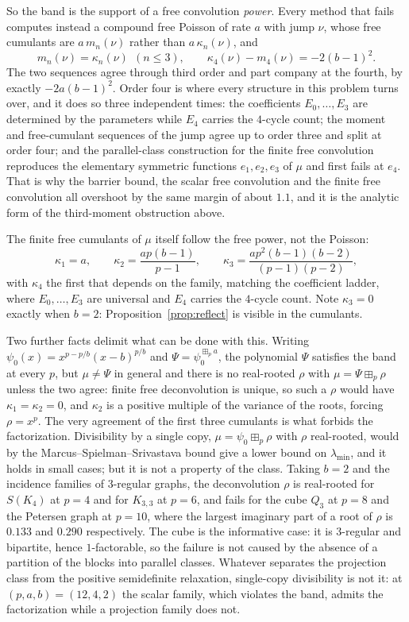 \documentclass[11pt]{article}
\theoremstyle{remark}
\begin{document}
So the band is the support of a free convolution \emph{power}. Every method that
fails computes instead a compound free Poisson of rate $a$ with jump $\nu$, whose
free cumulants are $a\,m_n(\nu)$ rather than $a\,\kappa_n(\nu)$, and
\[
m_n(\nu)=\kappa_n(\nu)\ \ (n\le3),\qquad
\kappa_4(\nu)-m_4(\nu)=-2(b-1)^2 .
\]
The two sequences agree through third order and part company at the fourth, by
exactly $-2a(b-1)^2$. Order four is where every structure in this problem turns
over, and it does so three independent times: the coefficients $E_0,\dots,E_3$ are
determined by the parameters while $E_4$ carries the $4$-cycle count; the moment and
free-cumulant sequences of the jump agree up to order three and split at order four;
and the parallel-class construction for the finite free convolution reproduces the
elementary symmetric functions $e_1,e_2,e_3$ of $\mu$ and first fails at $e_4$. That is why the barrier bound, the scalar free convolution
and the finite free convolution all overshoot by the same margin of about $1.1$,
and it is the analytic form of the third-moment obstruction above.

The finite free cumulants of $\mu$ itself follow the free power, not the Poisson:
\[
\kappa_1=a,\qquad \kappa_2=\frac{ap(b-1)}{p-1},\qquad
\kappa_3=\frac{ap^2(b-1)(b-2)}{(p-1)(p-2)},
\]
with $\kappa_4$ the first that depends on the family, matching the coefficient
ladder, where $E_0,\dots,E_3$ are universal and $E_4$ carries the $4$-cycle count.
Note $\kappa_3=0$ exactly when $b=2$: Proposition~\ref{prop:reflect} is visible in
the cumulants.

Two further facts delimit what can be done with this. Writing
$\psi_0(x)=x^{p-p/b}(x-b)^{p/b}$ and $\Psi=\psi_0^{\boxplus_pa}$, the polynomial
$\Psi$ satisfies the band at every $p$, but $\mu\ne\Psi$ in general and there is no
real-rooted $\rho$ with $\mu=\Psi\boxplus_p\rho$ unless the two agree: finite free
deconvolution is unique, so such a $\rho$ would have $\kappa_1=\kappa_2=0$, and
$\kappa_2$ is a positive multiple of the variance of the roots, forcing
$\rho=x^p$. The very agreement of the first three cumulants is what forbids the
factorization. Divisibility by a single copy, $\mu=\psi_0\boxplus_p\rho$ with $\rho$ real-rooted,
would by the Marcus--Spielman--Srivastava bound give a lower bound on
$\lambda_{\min}$, and it holds in small cases; but it is not a property of the
class. Taking $b=2$ and the incidence families of $3$-regular graphs, the
deconvolution $\rho$ is real-rooted for $S(K_4)$ at $p=4$ and for $K_{3,3}$ at
$p=6$, and fails for the cube $Q_3$ at $p=8$ and the Petersen graph at $p=10$,
where the largest imaginary part of a root of $\rho$ is $0.133$ and $0.290$
respectively. The cube is the informative case: it is $3$-regular and bipartite,
hence $1$-factorable, so the failure is not caused by the absence of a partition of
the blocks into parallel classes. Whatever separates the projection class from the
positive semidefinite relaxation, single-copy divisibility is not it: at
$(p,a,b)=(12,4,2)$ the scalar family, which violates the band, admits the
factorization while a projection family does not.
\end{document}
